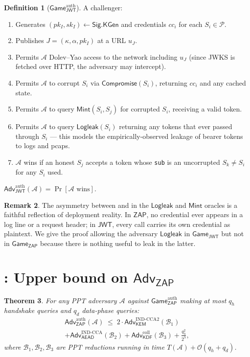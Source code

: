 \documentclass[11pt,a4paper]{article}
\theoremstyle{plain}
\newtheorem{theorem}{Theorem}
\theoremstyle{definition}
\newtheorem{definition}[theorem]{Definition}
\newtheorem{remark}[theorem]{Remark}
\newcommand{\Adv}{\mathsf{Adv}}
\newcommand{\GameG}{\mathsf{Game}}
\newcommand{\KEM}{\mathsf{KEM}}
\newcommand{\KDF}{\mathsf{KDF}}
\newcommand{\AEAD}{\mathsf{AEAD}}
\newcommand{\JWT}{\mathsf{JWT}}
\newcommand{\ZAP}{\mathsf{ZAP}}
\newcommand{\Sig}{\mathsf{Sig}}
\newcommand{\bigO}{\mathcal{O}}
\newcommand{\KeyGen}{\mathsf{KGen}}
\begin{document}
\begin{definition}[$\GameG_\JWT^{\text{auth}}$]
\label{def:gamejwt}
A challenger:
\begin{enumerate}[itemsep=2pt,topsep=2pt]
  \item Generates $(pk_I, sk_I) \gets \Sig.\KeyGen$ and credentials
        $cc_i$ for each $S_i \in \mathcal{P}$.
  \item Publishes $J = (\kappa, \alpha, pk_I)$ at a URL $u_J$.
  \item Permits $\mathcal{A}$ Dolev--Yao access to the network including
        $u_J$ (since JWKS is fetched over HTTP, the adversary may
        intercept).
  \item Permits $\mathcal{A}$ to corrupt $S_i$ via $\mathsf{Compromise}(S_i)$,
        returning $cc_i$ and any cached state.
  \item Permits $\mathcal{A}$ to query $\mathsf{Mint}(S_i, S_j)$ for
        corrupted $S_i$, receiving a valid token.
  \item Permits $\mathcal{A}$ to query $\mathsf{Logleak}(S_i)$ returning
        any tokens that ever passed through $S_i$ --- this models the
        empirically-observed leakage of bearer tokens to logs and pcaps.
  \item $\mathcal{A}$ wins if an honest $S_j$ accepts a token whose
        \texttt{sub} is an uncorrupted $S_k \neq S_i$ for any $S_i$ used.
\end{enumerate}
$\Adv_\JWT^{\text{auth}}(\mathcal{A}) = \Pr[\mathcal{A} \text{ wins}]$.
\end{definition}

\begin{remark}
The asymmetry between  and  in the
$\mathsf{Logleak}$ and $\mathsf{Mint}$ oracles is a faithful reflection of
deployment reality. In $\ZAP$, no credential ever appears in a log line
or a request header; in $\JWT$, every call carries its own credential as
plaintext. We give the proof allowing the adversary $\mathsf{Logleak}$
in $\GameG_\JWT$ but not in $\GameG_\ZAP$ because there is nothing useful
to leak in the latter.
\end{remark}

\section{: Upper bound on $\Adv_\ZAP$}

\begin{theorem}
\label{thm:zap}
For any PPT adversary $\mathcal{A}$ against $\GameG_\ZAP^{\text{auth}}$
making at most $q_h$ handshake queries and $q_d$ data-phase queries:
\begin{multline*}
\Adv_\ZAP^{\text{auth}}(\mathcal{A}) \;\le\; 2 \cdot \Adv_{\KEM}^{\mathrm{IND\text{-}CCA2}}(\mathcal{B}_1) \\
+ \Adv_{\AEAD}^{\mathrm{IND\text{-}CCA}}(\mathcal{B}_2)
+ \Adv_{\KDF}^{\mathrm{coll}}(\mathcal{B}_3)
+ \frac{q_h^2}{2^\lambda},
\end{multline*}
where $\mathcal{B}_1, \mathcal{B}_2, \mathcal{B}_3$ are PPT reductions
running in time $T(\mathcal{A}) + \bigO(q_h + q_d)$.
\end{theorem}
\end{document}
